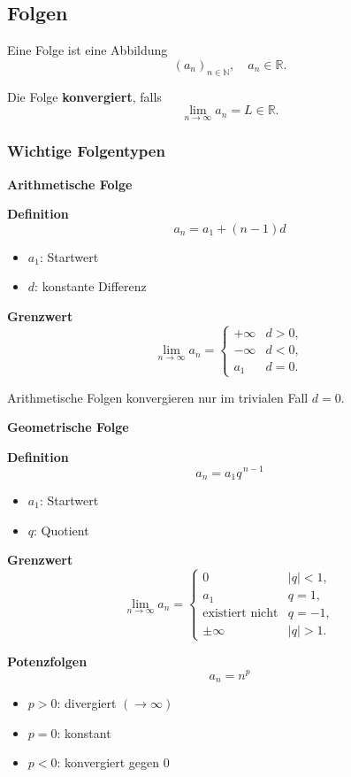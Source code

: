 \documentclass[../zusammenfassung_AN.tex]{subfiles}
\begin{document}
	
	\subsection{Folgen}
	
	Eine Folge ist eine Abbildung
	\[
	(a_n)_{n\in\mathbb{N}}, \quad a_n \in \mathbb{R}.
	\]
	
	Die Folge \textbf{konvergiert}, falls
	\[
	\lim_{n\to\infty} a_n = L \in \mathbb{R}.
	\]
	
	\subsubsection{Wichtige Folgentypen}
	
	\textbf{Arithmetische Folge}
	
	\textbf{Definition}
	\[
	a_n = a_1 + (n-1)d
	\]
	
	\begin{itemize}
		\item $a_1$: Startwert
		\item $d$: konstante Differenz
	\end{itemize}
	
	\textbf{Grenzwert}
	\[
	\lim_{n\to\infty} a_n =
	\begin{cases}
		+\infty & d>0, \\
		-\infty & d<0, \\
		a_1 & d=0.
	\end{cases}
	\]
	
	Arithmetische Folgen konvergieren nur im trivialen Fall $d=0$.
	
	\textbf{Geometrische Folge}
	
	\textbf{Definition}
	\[
	a_n = a_1 q^{\,n-1}
	\]
	
	\begin{itemize}
		\item $a_1$: Startwert
		\item $q$: Quotient
	\end{itemize}
	
	\textbf{Grenzwert}
	\[
	\lim_{n\to\infty} a_n =
	\begin{cases}
		0 & |q|<1, \\
		a_1 & q=1, \\
		\text{existiert nicht} & q=-1, \\
		\pm\infty & |q|>1.
	\end{cases}
	\]
	
	\textbf{Potenzfolgen}
	\[
	a_n = n^p
	\]
	
	\begin{itemize}
		\item $p>0$: divergiert $(\to \infty)$
		\item $p=0$: konstant
		\item $p<0$: konvergiert gegen $0$
	\end{itemize}
	
\end{document}
